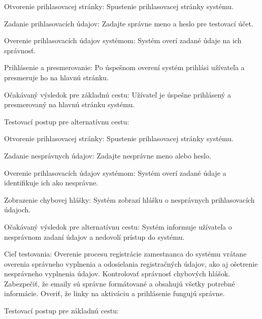 \startitemize[n]
\item{Otvorenie prihlasovacej stránky: Spustenie prihlasovacej stránky systému.}
\item{Zadanie prihlasovacích údajov: Zadajte správne meno a heslo pre testovací účet.}
\item{Overenie prihlasovacích údajov systémom: Systém overí zadané údaje na ich správnosť.}
\item{Prihlásenie a presmerovanie: Po úspešnom overení systém prihlási užívateľa a presmeruje ho na hlavnú stránku.}
\stopitemize

Očakávaný výsledok pre základnú cestu: Užívateľ je úspešne prihlásený a presmerovaný na hlavnú stránku systému.


\blank
Testovací postup pre alternatívnu cestu:

\startitemize[n]
\item{Otvorenie prihlasovacej stránky: Spustenie prihlasovacej stránky systému.}
\item{Zadanie nesprávnych údajov: Zadajte nesprávne meno alebo heslo.}
\item{Overenie prihlasovacích údajov systémom: Systém overí zadané údaje a identifikuje ich ako nesprávne.}
\item{Zobrazenie chybovej hlášky: Systém zobrazí hlášku o nesprávnych prihlasovacích údajoch.}
\stopitemize

Očakávaný výsledok pre alternatívnu cestu: Systém informuje užívateľa o nesprávnom zadaní údajov a nedovolí prístup do systému.


Cieľ testovania: Overenie procesu registrácie zamestnanca do systému vrátane overenia správneho vyplnenia a odosielania registračných údajov, ako aj ošetrenie nesprávneho vyplnenia údajov. Kontrolovať správnosť chybových hlášok. Zabezpečiť, že emaily sú správne formátované a obsahujú všetky potrebné informácie. Overiť, že linky na aktiváciu a prihlásenie fungujú správne.

\blank
Testovací postup pre základnú cestu:

